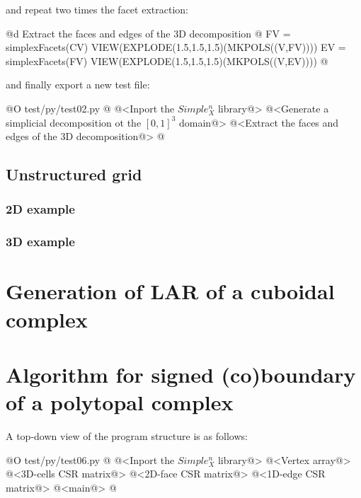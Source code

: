 \documentclass[11pt,oneside]{article}	%
\begin{document}
and repeat two times the facet extraction:

@d Extract the faces and edges of the 3D decomposition
@{
FV = simplexFacets(CV)
VIEW(EXPLODE(1.5,1.5,1.5)(MKPOLS((V,FV))))
EV = simplexFacets(FV)
VIEW(EXPLODE(1.5,1.5,1.5)(MKPOLS((V,EV))))
@}

and finally export a new test file:

@O test/py/test02.py 
@{
@<Inport the $Simple_X^n$ library@>
@<Generate a simplicial decomposition ot the $[0,1]^3$ domain@>
@<Extract the faces and edges of the 3D decomposition@>
@}


\subsection{Unstructured grid}


\subsubsection{2D example}


\subsubsection{3D example}




\section{Generation of LAR of a cuboidal complex}
\label{cuboidal}

\section{Algorithm for signed (co)boundary of a polytopal complex}
\label{polytopal}

A top-down view of the program structure is as follows:

@O test/py/test06.py
@{
@<Inport the $Simple_X^n$ library@>
@<Vertex array@>
@<3D-cells CSR matrix@>
@<2D-face CSR matrix@>
@<1D-edge CSR matrix@>
@<main@>
@}
\end{document}
